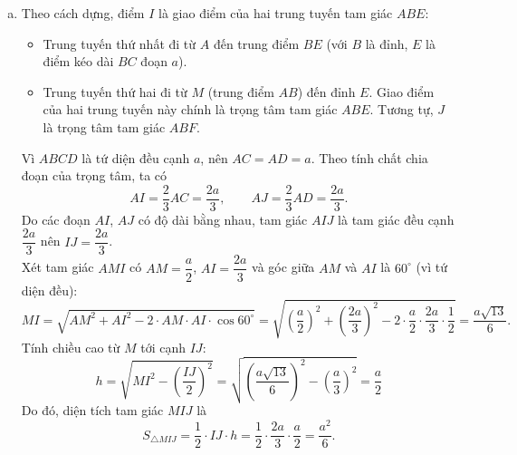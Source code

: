 \begin{ex}
{\begin{enumerate}[a)]
\begin{itemize}
			\item \textbf{Trên mặt $(ABD)$:} Giao tuyến của mặt phẳng $(MEF)$ với $(ABD)$ là đường thẳng $MJ$, trong đó $J$ là giao điểm của $MF$  với $AD$.
			\item  \textbf{Trên mặt $(ACD)$:} Giao tuyến của mặt phẳng $(MEF)$ với $(ACD)$ là đường thẳng $IJ$, nối hai điểm $I$ và $J$ vừa xác định ở trên.
		\end{itemize}
		Vậy thiết diện của tứ diện đều $ABCD$ với mặt phẳng $(MEF)$  là tam giác $MIJ$.
		\item Theo cách dựng, điểm $I$ là giao điểm của hai trung tuyến  tam giác $ABE$:
		\begin{itemize}
			\item Trung tuyến thứ nhất đi từ $A$ đến trung  điểm $BE$ (với $B$ là đỉnh, $E$ là điểm kéo dài $BC$ đoạn $a$).
			\item Trung tuyến thứ hai đi từ $M$ (trung điểm $AB$) đến đỉnh $E$. Giao điểm của hai trung tuyến  này chính là trọng tâm tam giác $ABE$. Tương tự, $J$ là trọng tâm tam giác $ABF$.
		\end{itemize}
		Vì $ABCD$ là tứ diện đều cạnh $a$, nên $AC=AD=a$. Theo tính chất  chia đoạn của trọng tâm, ta có
		 \[AI=\dfrac{2}{3} AC=\dfrac{2a}{3}, \qquad AJ=\dfrac{2}{3} AD=\dfrac{2a}{3}.\]
		Do các đoạn $AI$, $AJ$  có độ dài bằng nhau, tam giác $AIJ$ là tam giác đều cạnh $\dfrac{2a}{3}$ nên $IJ=\dfrac{2a}{3}$.\\
		Xét tam giác $AMI$ có $AM=\dfrac{a}{2}$, $AI=\dfrac{2a}{3}$ và góc giữa $AM$ và $AI$ là  $60^{\circ}$ (vì tứ diện đều):
		\[MI=\sqrt{AM^2+AI^2-2 \cdot AM\cdot  AI\cdot \cos 60^{\circ}}=\sqrt{\left(\dfrac{a}{2}\right)^2+\left(\dfrac{2a}{3}\right)^2-2 \cdot \dfrac{a}{2} \cdot \dfrac{2a}{3} \cdot \dfrac{1}{2}}=\dfrac{a\sqrt{13}}{6}.\]
		 Tính chiều cao từ $M$ tới cạnh $IJ$:
		\[h=\sqrt{MI^2-\left(\dfrac{IJ}{2}\right)^2}=\sqrt{\left(\dfrac{a\sqrt{13}}{6}\right)^2-\left(\dfrac{a}{3}\right)^2}=\dfrac{a}{2}\] 
		Do  đó, diện tích tam giác $MIJ$ là
		\[S_{\triangle MIJ}=\dfrac{1}{2}  \cdot IJ\cdot h=\dfrac{1}{2} \cdot \dfrac{2a}{3} \cdot \dfrac{a}{2}=\dfrac{a^2}{6}.\]
	\end{enumerate}
} 
\end{ex}

